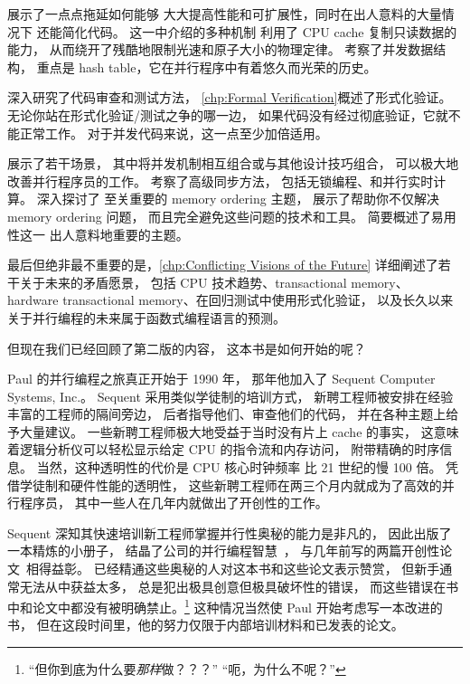 展示了一点点拖延如何能够
大大提高性能和可扩展性，同时在出人意料的大量情况下
还能简化代码。
这一中介绍的多种机制
利用了 CPU cache 复制只读数据的能力，
从而绕开了残酷地限制光速和原子大小的物理定律。
考察了并发数据结构，
重点是 hash table，它在并行程序中有着悠久而光荣的历史。

深入研究了代码审查和测试方法，
\cref{chp:Formal Verification}概述了形式化验证。
无论你站在形式化验证/测试之争的哪一边，
如果代码没有经过彻底验证，它就不能正常工作。
对于并发代码来说，这一点至少加倍适用。

展示了若干场景，
其中将并发机制相互组合或与其他设计技巧组合，
可以极大地改善并行程序员的工作。
考察了高级同步方法，
包括无锁编程、和并行实时计算。
深入探讨了
至关重要的 memory ordering 主题，
展示了帮助你不仅解决 memory ordering 问题，
而且完全避免这些问题的技术和工具。
简要概述了易用性这一
出人意料地重要的主题。

最后但绝非最不重要的是，\cref{chp:Conflicting Visions of the Future}
详细阐述了若干关于未来的矛盾愿景，
包括 CPU 技术趋势、transactional memory、
hardware transactional memory、在回归测试中使用形式化验证，
以及长久以来关于并行编程的未来属于函数式编程语言的预测。

但现在我们已经回顾了第二版的内容，
这本书是如何开始的呢？

Paul 的并行编程之旅真正开始于 1990 年，
那年他加入了 Sequent Computer Systems, Inc.。
Sequent 采用类似学徒制的培训方式，
新聘工程师被安排在经验丰富的工程师的隔间旁边，
后者指导他们、审查他们的代码，
并在各种主题上给予大量建议。
一些新聘工程师极大地受益于当时没有片上 cache 的事实，
这意味着逻辑分析仪可以轻松显示给定 CPU 的指令流和内存访问，
附带精确的时序信息。
当然，这种透明性的代价是 CPU 核心时钟频率
比 21 世纪的慢 100 倍。
凭借学徒制和硬件性能的透明性，
这些新聘工程师在两三个月内就成为了高效的并行程序员，
其中一些人在几年内就做出了开创性的工作。

Sequent 深知其快速培训新工程师掌握并行性奥秘的能力是非凡的，
因此出版了一本精炼的小册子，
结晶了公司的并行编程智慧~\cite{SQNTParallel}，
与几年前写的两篇开创性论文~\cite{Beck85,Inman85}相得益彰。
已经精通这些奥秘的人对这本书和这些论文表示赞赏，
但新手通常无法从中获益太多，
总是犯出极具创意但极具破坏性的错误，
而这些错误在书中和论文中都没有被明确禁止。\footnote{
	``但你到底为什么要\emph{那样}做？？？''
	``呃，为什么不呢？''}
这种情况当然使 Paul 开始考虑写一本改进的书，
但在这段时间里，他的努力仅限于内部培训材料和已发表的论文。

